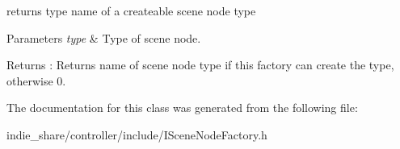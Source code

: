 returns type name of a createable scene node type 


\begin{DoxyParams}{Parameters}
{\em type} & Type of scene node. \\
\hline
\end{DoxyParams}
\begin{DoxyReturn}{Returns}
\+: Returns name of scene node type if this factory can create the type, otherwise 0. 
\end{DoxyReturn}


The documentation for this class was generated from the following file\+:\begin{DoxyCompactItemize}
\item 
indie\+\_\+share/controller/include/I\+Scene\+Node\+Factory.\+h\end{DoxyCompactItemize}
